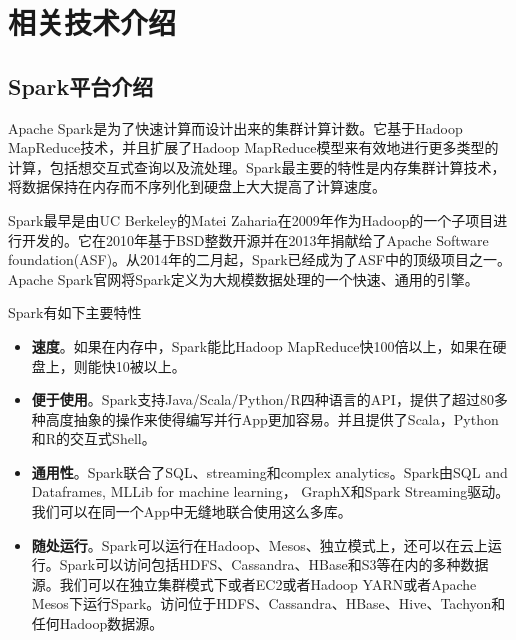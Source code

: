 \chapter{相关技术介绍}
\section{Spark平台介绍}
Apache Spark是为了快速计算而设计出来的集群计算计数。它基于Hadoop MapReduce技术，并且扩展了Hadoop MapReduce模型来有效地进行更多类型的计算，包括想交互式查询以及流处理。Spark最主要的特性是内存集群计算技术，将数据保持在内存而不序列化到硬盘上大大提高了计算速度。

Spark最早是由UC Berkeley的Matei Zaharia在2009年作为Hadoop的一个子项目进行开发的。它在2010年基于BSD整数开源并在2013年捐献给了Apache Software foundation(ASF)。从2014年的二月起，Spark已经成为了ASF中的顶级项目之一。Apache Spark官网将Spark定义为大规模数据处理的一个快速、通用的引擎。

Spark有如下主要特性
\begin{itemize}
    \item \textbf{速度}。如果在内存中，Spark能比Hadoop MapReduce快100倍以上，如果在硬盘上，则能快10被以上。
    \item \textbf{便于使用}。Spark支持Java/Scala/Python/R四种语言的API，提供了超过80多种高度抽象的操作来使得编写并行App更加容易。并且提供了Scala，Python和R的交互式Shell。
    \item \textbf{通用性}。Spark联合了SQL、streaming和complex analytics。Spark由SQL and Dataframes, MLLib for machine learning， GraphX和Spark Streaming驱动。我们可以在同一个App中无缝地联合使用这么多库。
    \item \textbf{随处运行}。Spark可以运行在Hadoop、Mesos、独立模式上，还可以在云上运行。Spark可以访问包括HDFS、Cassandra、HBase和S3等在内的多种数据源。我们可以在独立集群模式下或者EC2或者Hadoop YARN或者Apache Mesos下运行Spark。访问位于HDFS、Cassandra、HBase、Hive、Tachyon和任何Hadoop数据源。
\end{itemize}

